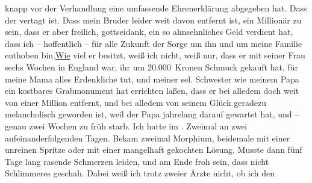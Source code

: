 \begin{ledgroupsized}[t]{13cm}
               knapp vor der Verhandlung eine umfassende Ehrenerklärung abgegeben hat. Dass der
                  \label{K_L03430-11v}\label{K_L03430-11h} vertagt ist. Dass mein Bruder leider weit davon entfernt ist, ein Millionär {\pb}zu sein, dass er aber freilich,
               gottseidank, ein so ahnsehnliches Geld verdient hat, dass ich – hoffentlich – für
               alle Zukunft der Sorge um ihn und um meine Familie enthoben bin.\uline{Wie} viel er besitzt, weiß ich nicht, weiß nur, dass er mit seiner Frau sechs Wochen in England war, ihr um 20.000 Kronen Schmuck gekauft
               hat, für meine Mama alles
               Erdenkliche tut, und meiner sel. Schwester wie meinem Papa ein kostbares Grabmonument hat errichten laßen, dass er bei alledem
               doch weit von einer Million entfernt, und bei alledem von seinem Glück geradezu
               melancholisch geworden ist, weil der Papa jahrelang darauf gewartet hat, und – genau zwei Wochen
               zu früh starb. Ich hatte im \label{K_L03430-43v}\label{K_L03430-43h}. Zweimal an zwei aufeinanderfolgenden Tagen. Bekam zweimal Morphium,
               beidemale mit einer unreinen Spritze oder mit einer mangelhaft gekochten Lösung.
               Musste dann fünf Tage lang rasende Schmerzen leiden, und am Ende froh sein, dass
               nicht Schlimmeres geschah. Dabei weiß ich trotz zweier Ärzte nicht, ob ich den

\end{ledgroupsized}
